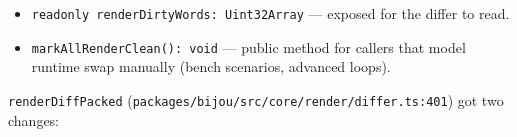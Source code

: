 \begin{itemize}
\tightlist
\item
  \texttt{r\allowbreak{}e\allowbreak{}a\allowbreak{}d\allowbreak{}o\allowbreak{}n\allowbreak{}l\allowbreak{}y\allowbreak{} \allowbreak{}r\allowbreak{}e\allowbreak{}n\allowbreak{}d\allowbreak{}e\allowbreak{}r\allowbreak{}D\allowbreak{}i\allowbreak{}r\allowbreak{}t\allowbreak{}y\allowbreak{}W\allowbreak{}o\allowbreak{}r\allowbreak{}d\allowbreak{}s\allowbreak{}:\allowbreak{} \allowbreak{}U\allowbreak{}i\allowbreak{}n\allowbreak{}t\allowbreak{}3\allowbreak{}2\allowbreak{}A\allowbreak{}r\allowbreak{}r\allowbreak{}a\allowbreak{}y} --- exposed for the differ to read.
\item
  \texttt{m\allowbreak{}a\allowbreak{}r\allowbreak{}k\allowbreak{}A\allowbreak{}l\allowbreak{}l\allowbreak{}R\allowbreak{}e\allowbreak{}n\allowbreak{}d\allowbreak{}e\allowbreak{}r\allowbreak{}C\allowbreak{}l\allowbreak{}e\allowbreak{}a\allowbreak{}n\allowbreak{}(\allowbreak{})\allowbreak{}:\allowbreak{} \allowbreak{}v\allowbreak{}o\allowbreak{}i\allowbreak{}d} --- public method for callers that model runtime swap manually (bench scenarios, advanced loops).
\end{itemize}

\texttt{r\allowbreak{}e\allowbreak{}n\allowbreak{}d\allowbreak{}e\allowbreak{}r\allowbreak{}D\allowbreak{}i\allowbreak{}f\allowbreak{}f\allowbreak{}P\allowbreak{}a\allowbreak{}c\allowbreak{}k\allowbreak{}e\allowbreak{}d} (\texttt{p\allowbreak{}a\allowbreak{}c\allowbreak{}k\allowbreak{}a\allowbreak{}g\allowbreak{}e\allowbreak{}s\allowbreak{}/\allowbreak{}b\allowbreak{}i\allowbreak{}j\allowbreak{}o\allowbreak{}u\allowbreak{}/\allowbreak{}s\allowbreak{}r\allowbreak{}c\allowbreak{}/\allowbreak{}c\allowbreak{}o\allowbreak{}r\allowbreak{}e\allowbreak{}/\allowbreak{}r\allowbreak{}e\allowbreak{}n\allowbreak{}d\allowbreak{}e\allowbreak{}r\allowbreak{}/\allowbreak{}d\allowbreak{}i\allowbreak{}f\allowbreak{}f\allowbreak{}e\allowbreak{}r\allowbreak{}.\allowbreak{}t\allowbreak{}s\allowbreak{}:\allowbreak{}4\allowbreak{}0\allowbreak{}1}) got two changes:

